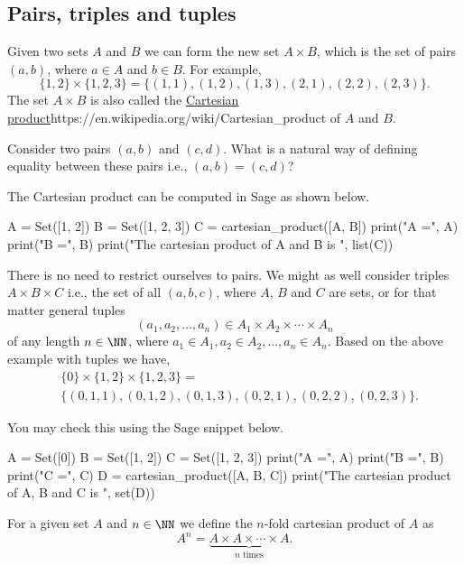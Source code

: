 \documentclass{article}
\begin{document}
\subsection{Pairs, triples and tuples}

Given two sets $A$ and $B$ we can form the new set $A\times B$,
which is the set of pairs $(a, b)$, where $a\in A$ and
$b\in B$. For example,
$$
\{1, 2\}\times \{1, 2, 3\} = 
\{(1, 1), (1, 2), (1, 3), (2, 1), (2, 2), (2, 3)\}.
$$
The set $A\times B$ is also called the \url{Cartesian
  product}{https://en.wikipedia.org/wiki/Cartesian_product} of $A$ and
$B$.


\beginshex
Consider two pairs $(a, b)$ and $(c, d)$. What is a natural way of defining
equality between these pairs i.e., $(a, b) = (c, d)$?
\endshex

The Cartesian product can be computed in Sage as shown below.

\begin{sage}
A = Set([1, 2])
B = Set([1, 2, 3])
C = cartesian_product([A, B])
print("A =", A)
print("B =", B)
print("The cartesian product of A and B is ", list(C))
\end{sage}

There is no need to restrict ourselves to pairs. We might as well
consider triples $A\times B\times C$ i.e., 
the set of all $(a, b, c)$, where $A$, $B$ and $C$ are sets, or
for that matter general tuples
$$
(a_1, a_2, \dots, a_n)\in A_1\times A_2\times \cdots \times A_n
$$
of any length $n\in \NN$, where $a_1\in A_1, a_2\in A_2, 
\dots, a_n\in A_n$. Based on the above example with tuples we have,
\begin{align*}
&\{0\}\times\{1, 2\}\times \{1, 2, 3\} = \\
&\{(0, 1, 1), (0, 1, 2), (0, 1, 3), (0, 2, 1), (0, 2, 2), (0, 2, 3)\}.
\end{align*}

You may check this using the Sage snippet below.

\begin{sage}
A = Set([0])
B = Set([1, 2])
C = Set([1, 2, 3])
print("A =", A)
print("B =", B)
print("C =", C)
D = cartesian_product([A, B, C])
print("The cartesian product of A, B and C is ", set(D))
\end{sage}

\begin{definition}
For a given set $A$ and $n\in \NN$ we define the $n$-fold cartesian product of $A$ as
$$
A^n = \underbrace{A\times A\times \cdots \times A}_{n\text{ times}}.
$$
\end{definition}
\end{document}
